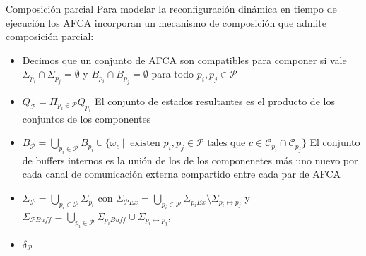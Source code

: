 \documentclass[10pt,xcolor={table,dvipsnames},t]{beamer}
\begin{document}
\begin{frame}{Composición parcial}
Para modelar la reconfiguración dinámica en tiempo de ejecución los AFCA incorporan un mecanismo de composición que admite composición parcial:
\begin{itemize}
    \item Decimos que un conjunto de AFCA son compatibles para componer si vale $\Sigma_{p_i} \cap \Sigma_{p_j}= \emptyset$ y $B_{p_i} \cap B_{p_j} = \emptyset$ para todo $p_i, p_j \in \mathcal{P}$
    \item $Q_\mathcal{P}= \Pi_{p_i \in \mathcal{P}} Q_{p_i}$ El conjunto de estados resultantes es el producto de los conjuntos de los componentes
    \item $B_\mathcal{P} = \bigcup_{p_i \in \mathcal{P}} B_{p_i} \cup \{ \omega_c \ | \ \mbox{ existen } p_i, p_j \in \mathcal{P} \mbox{ tales que } c \in \mathcal{C}_{p_i} \cap \mathcal{C}_{p_j} \}$ El conjunto de buffers internos es la unión de los de los componenetes más uno nuevo por cada canal de comunicación externa compartido entre cada par de AFCA
    \item $\Sigma_\mathcal{P} = \bigcup_{p_i \in \mathcal{P}} \Sigma_{p_i}$ con $\Sigma_{\mathcal{P}\mathit{Ex}} = \bigcup_{p_i \in \mathcal{P}} \Sigma_{p_i\mathit{Ex}} \setminus \Sigma_{p_i \mapsto p_j}$ y $\Sigma_{\mathcal{P}\mathit{Buff}} = \bigcup_{p_i \in \mathcal{P}} \Sigma_{p_i\mathit{Buff}} \cup \Sigma_{p_i \mapsto p_j}$,
    \item $\delta_\mathcal{P}$ 
    
\end{itemize}
    
\end{frame}
\end{document}
